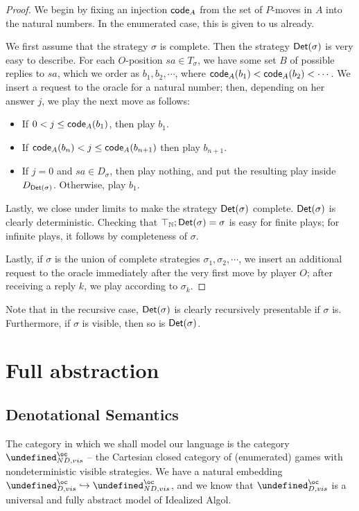 \documentclass[sigplan,9pt,review]{acmart}\settopmatter{printfolios=true,printccs=false,printacmref=false}
\let\G\undefined
\begin{document}
\begin{proof}
  We begin by fixing an injection $\mathsf{code}_A$ from the set of $P$-moves in $A$ into the natural numbers.  
  In the enumerated case, this is given to us already.
  
  We first assume that the strategy $\sigma$ is complete.
  Then the strategy $\mathsf{Det}(\sigma)$ is very easy to describe.  
  For each $O$-position $sa\in T_\sigma$, we have some set $B$ of possible replies to $sa$, which we order as $b_1,b_2,\cdots$, where $\mathsf{code}_A(b_1)<\mathsf{code}_A(b_2)<\cdots$.  
  We insert a request to the oracle for a natural number; then, depending on her answer $j$, we play the next move as follows:
  \begin{itemize}
    \item If $0 < j \le \mathsf{code}_A(b_1)$, then play $b_1$.
    \item If $\mathsf{code}_A(b_n) < j \le \mathsf{code}_A(b_{n+1})$ then play $b_{n+1}$.
    \item If $j = 0$ and $sa\in D_\sigma$, then play nothing, and put the resulting play inside $D_{\mathsf{Det}(\sigma)}$.  
      Otherwise, play $b_1$.
  \end{itemize}
  Lastly, we close under limits to make the strategy $\mathsf{Det}(\sigma)$ complete.  
  $\mathsf{Det}(\sigma)$ is clearly deterministic.  
  Checking that $\top_{\mathbb{N}};\mathsf{Det}(\sigma)=\sigma$ is easy for finite plays; for infinite plays, it follows by completeness of $\sigma$.

  Lastly, if $\sigma$ is the union of complete strategies $\sigma_1,\sigma_2,\cdots$, we insert an additional request to the oracle immediately after the very first move by player $O$; after receiving a reply $k$, we play according to $\sigma_k$.
\end{proof}

Note that in the recursive case, $\mathsf{Det}(\sigma)$ is clearly recursively presentable if $\sigma$ is.  
Furthermore, if $\sigma$ is visible, then so is $\mathsf{Det}(\sigma)$.

\section{Full abstraction}

\subsection{Denotational Semantics}

The category in which we shall model our language is the category $\G_{ND,vis}^\oc$ -- the Cartesian closed category of (enumerated) games with nondeterministic visible strategies.  
We have a natural embedding $\G_{D,vis}^\oc\hookrightarrow\G_{ND,vis}^\oc$, and we know that $\G_{D,vis}^\oc$ is a universal and fully abstract model of Idealized Algol.
\end{document}
